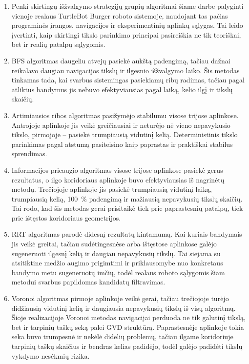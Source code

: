 \documentclass[]{VUMIFTemplateClass}
\begin{document}

\begin{enumerate}
  \item Penki skirtingų išžvalgymo strategijų grupių algoritmai šiame darbe palyginti vienoje realaus TurtleBot Burger roboto sistemoje, naudojant tas pačias
  programinės įrangos, navigacijos ir eksperimentinių aplinkų sąlygas. Tai leido įvertinti, kaip skirtingi tikslo parinkimo principai pasireiškia ne tik
  teoriškai, bet ir realių patalpų sąlygomis.

  \item BFS algoritmas daugeliu atvejų pasiekė aukštą padengimą, tačiau dažnai reikalavo daugiau navigacijos tikslų ir ilgesnio išžvalgymo laiko. Šis metodas
tinkamas tada, kai svarbus sistemingas pasiekiamų ribų radimas, tačiau pagal atliktus bandymus jis nebuvo efektyviausias pagal laiką, kelio ilgį ir tikslų
skaičių.

\item Artimiausios ribos algoritmas pasižymėjo stabilumu visose trijose aplinkose. Antrojoje aplinkoje jis veikė greičiausiai ir neturėjo nė vieno nepavykusio   
  tikslo, pirmojoje -- pasiekė trumpiausią vidutinį kelią. Deterministinis tikslo parinkimas pagal atstumą pasiteisino kaip paprastas ir praktiškai stabilus sprendimas.

\item Informacijos prieaugio algoritmas visose trijose aplinkose pasiekė gerus rezultatus, o ilgo koridoriaus aplinkoje buvo efektyviausias iš nagrinėtų
  metodų. Trečiojoje aplinkoje jis pasiekė trumpiausią vidutinį laiką, trumpiausią kelią, 100~\% padengimą ir mažiausią nepavykusių tikslų skaičių. Tai rodo,
  kad šis metodas gerai prisitaikė tiek prie paprastesnių patalpų, tiek prie ištęstos koridoriaus geometrijos.

  \item RRT algoritmas parodė didesnį rezultatų kintamumą. Kai kuriais bandymais jis veikė greitai, tačiau sudėtingesnėse arba ištęstose aplinkose galėjo
sugeneruoti ilgesnį kelią ir daugiau nepavykusių tikslų. Tai siejama su atsitiktine medžio augimo prigimtimi ir priklausomybe nuo konkretaus bandymo metu
sugeneruotų imčių, todėl realaus roboto sąlygomis šiam metodui svarbus papildomas kandidatų filtravimas.

  \item Voronoi algoritmas pirmoje aplinkoje veikė gerai, tačiau trečiojoje turėjo didžiausią vidutinį kelią ir daugiausia nepavykusių
  tikslų iš visų algoritmų. Šioje realizacijoje Voronoi metodas navigacijai perduoda ne tik galutinį tikslą, bet ir tarpinių
  taškų seką palei GVD struktūrą. Paprastesnėje aplinkoje tokia seka buvo trumpesnė ir nekėlė didelių problemų, tačiau ilgame koridoriuje tarpinių taškų
  skaičius ir bendras kelias padidėjo, todėl galėjo padidėti tikslų vykdymo nesėkmių rizika.


\end{enumerate}
\end{document}
